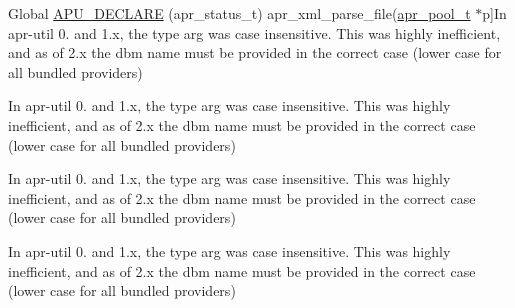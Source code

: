 \begin{DoxyRefList}
\hypertarget{bug__bug000019}{}%
Global \hyperlink{group__APR__Util__XML_ga4f95eb2fce8f447db01a30585adbd6dc}{A\+P\+U\+\_\+\+D\+E\+C\+L\+A\+RE} (apr\+\_\+status\+\_\+t) apr\+\_\+xml\+\_\+parse\+\_\+file(\hyperlink{structapr__pool__t}{apr\+\_\+pool\+\_\+t} $\ast$p]In apr-\/util 0. and 1.\+x, the type arg was case insensitive. This was highly inefficient, and as of 2.\+x the dbm name must be provided in the correct case (lower case for all bundled providers)  
\item[\label{bug__bug000019}%
\hypertarget{bug__bug000019}{}%
Global \hyperlink{group__APR__Util__XML_ga4f95eb2fce8f447db01a30585adbd6dc}{A\+P\+U\+\_\+\+D\+E\+C\+L\+A\+RE} (apr\+\_\+status\+\_\+t) apr\+\_\+xml\+\_\+parse\+\_\+file(\hyperlink{structapr__pool__t}{apr\+\_\+pool\+\_\+t} $\ast$p]In apr-\/util 0. and 1.\+x, the type arg was case insensitive. This was highly inefficient, and as of 2.\+x the dbm name must be provided in the correct case (lower case for all bundled providers)  
\item[\label{bug__bug000019}%
\hypertarget{bug__bug000019}{}%
Global \hyperlink{group__APR__Util__XML_ga4f95eb2fce8f447db01a30585adbd6dc}{A\+P\+U\+\_\+\+D\+E\+C\+L\+A\+RE} (apr\+\_\+status\+\_\+t) apr\+\_\+xml\+\_\+parse\+\_\+file(\hyperlink{structapr__pool__t}{apr\+\_\+pool\+\_\+t} $\ast$p]In apr-\/util 0. and 1.\+x, the type arg was case insensitive. This was highly inefficient, and as of 2.\+x the dbm name must be provided in the correct case (lower case for all bundled providers)  
\item[\label{bug__bug000019}%
\hypertarget{bug__bug000019}{}%
Global \hyperlink{group__APR__Util__XML_ga4f95eb2fce8f447db01a30585adbd6dc}{A\+P\+U\+\_\+\+D\+E\+C\+L\+A\+RE} (apr\+\_\+status\+\_\+t) apr\+\_\+xml\+\_\+parse\+\_\+file(\hyperlink{structapr__pool__t}{apr\+\_\+pool\+\_\+t} $\ast$p]In apr-\/util 0. and 1.\+x, the type arg was case insensitive. This was highly inefficient, and as of 2.\+x the dbm name must be provided in the correct case (lower case for all bundled providers) 
\end{DoxyRefList}